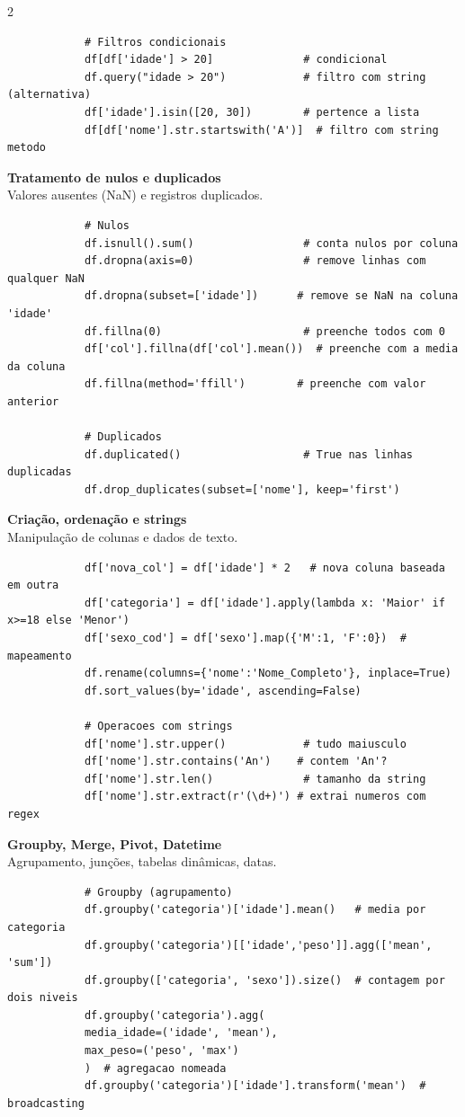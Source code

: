 \documentclass[a4paper]{article}
\begin{document}
\begin{multicols}{2}
\begin{lstlisting}
			# Filtros condicionais
			df[df['idade'] > 20]              # condicional
			df.query("idade > 20")            # filtro com string (alternativa)
			df['idade'].isin([20, 30])        # pertence a lista
			df[df['nome'].str.startswith('A')]  # filtro com string metodo
		\end{lstlisting}
		
		\noindent\textbf{Tratamento de nulos e duplicados} \\
		Valores ausentes (NaN) e registros duplicados.
		\begin{lstlisting}
			# Nulos
			df.isnull().sum()                 # conta nulos por coluna
			df.dropna(axis=0)                 # remove linhas com qualquer NaN
			df.dropna(subset=['idade'])      # remove se NaN na coluna 'idade'
			df.fillna(0)                      # preenche todos com 0
			df['col'].fillna(df['col'].mean())  # preenche com a media da coluna
			df.fillna(method='ffill')        # preenche com valor anterior
			
			# Duplicados
			df.duplicated()                   # True nas linhas duplicadas
			df.drop_duplicates(subset=['nome'], keep='first')
		\end{lstlisting}
		
		\noindent\textbf{Criação, ordenação e strings} \\
		Manipulação de colunas e dados de texto.
		\begin{lstlisting}
			df['nova_col'] = df['idade'] * 2   # nova coluna baseada em outra
			df['categoria'] = df['idade'].apply(lambda x: 'Maior' if x>=18 else 'Menor')
			df['sexo_cod'] = df['sexo'].map({'M':1, 'F':0})  # mapeamento
			df.rename(columns={'nome':'Nome_Completo'}, inplace=True)
			df.sort_values(by='idade', ascending=False)
			
			# Operacoes com strings
			df['nome'].str.upper()            # tudo maiusculo
			df['nome'].str.contains('An')    # contem 'An'?
			df['nome'].str.len()              # tamanho da string
			df['nome'].str.extract(r'(\d+)') # extrai numeros com regex
		\end{lstlisting}
		
		\noindent\textbf{Groupby, Merge, Pivot, Datetime} \\
		Agrupamento, junções, tabelas dinâmicas, datas.
		\begin{lstlisting}
			# Groupby (agrupamento)
			df.groupby('categoria')['idade'].mean()   # media por categoria
			df.groupby('categoria')[['idade','peso']].agg(['mean', 'sum'])
			df.groupby(['categoria', 'sexo']).size()  # contagem por dois niveis
			df.groupby('categoria').agg(
			media_idade=('idade', 'mean'),
			max_peso=('peso', 'max')
			)  # agregacao nomeada
			df.groupby('categoria')['idade'].transform('mean')  # broadcasting
			

\end{lstlisting}
\end{multicols}
\end{document}
